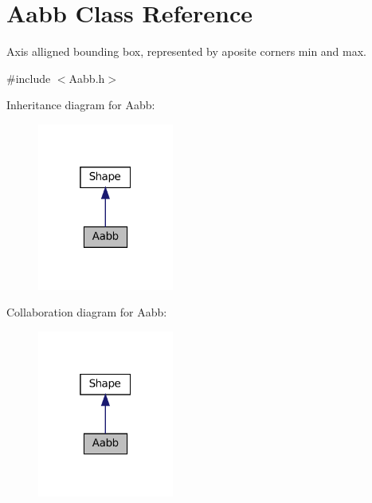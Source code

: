 \hypertarget{classAabb}{}\section{Aabb Class Reference}
\label{classAabb}


Axis alligned bounding box, represented by aposite corners min and max.  




{\ttfamily \#include $<$Aabb.\+h$>$}



Inheritance diagram for Aabb\+:
\nopagebreak
\begin{figure}[H]
\begin{center}
\leavevmode
\includegraphics[width=127pt]{classAabb__inherit__graph}
\end{center}
\end{figure}


Collaboration diagram for Aabb\+:
\nopagebreak
\begin{figure}[H]
\begin{center}
\leavevmode
\includegraphics[width=127pt]{classAabb__coll__graph}
\end{center}
\end{figure}
